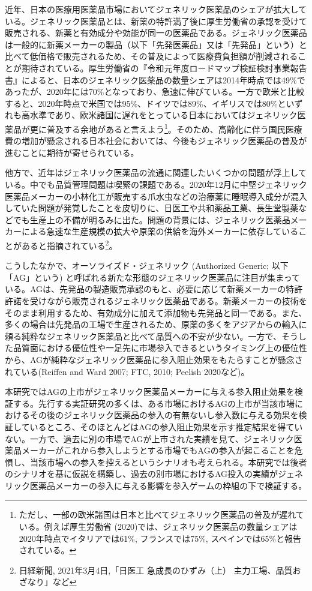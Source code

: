 \documentclass[a4j,10.5pt]{jarticle}
\begin{document}
近年、日本の医療用医薬品市場においてジェネリック医薬品のシェアが拡大している。ジェネリック医薬品とは、新薬の特許満了後に厚生労働省の承認を受けて販売される、新薬と有効成分や効能が同一の医薬品である。ジェネリック医薬品は一般的に新薬メーカーの製品（以下「先発医薬品」又は「先発品」という）と比べて低価格で販売されるため、その普及によって医療費負担額が削減されることが期待されている。厚生労働省の『令和元年度ロードマップ検証検討事業報告書』によると、日本のジェネリック医薬品の数量シェアは2014年時点では49\%であったが、2020年には70\%となっており、急速に伸びている。一方で欧米と比較すると、2020年時点で米国では95\%、ドイツでは89\%、イギリスでは80\%といずれも高水準であり、欧米諸国に遅れをとっている日本においてはジェネリック医薬品が更に普及する余地があると言えよう\footnote{ただし、一部の欧米諸国は日本と比べてジェネリック医薬品の普及が遅れている。例えば厚生労働省 (2020)では、ジェネリック医薬品の数量シェアは2020年時点でイタリアでは61\%, フランスでは75\%, スペインでは65\%と報告されている。}。そのため、高齢化に伴う国民医療費の増加が懸念される日本社会においては、今後もジェネリック医薬品の普及が進むことに期待が寄せられている。\par
他方で、近年はジェネリック医薬品の流通に関連したいくつかの問題が浮上している。中でも品質管理問題は喫緊の課題である。2020年12月に中堅ジェネリック医薬品メーカーの小林化工が販売する爪水虫などの治療薬に睡眠導入成分が混入していた問題が発覚したことを皮切りに、日医工や共和薬品工業、長生堂製薬などでも生産上の不備が明るみに出た。問題の背景には、ジェネリック医薬品メーカーによる急速な生産規模の拡大や原薬の供給を海外メーカーに依存していることがあると指摘されている\footnote{日経新聞, 2021年3月4日,「日医工 急成長のひずみ（上） 主力工場、品質おざなり」など}。\par
こうしたなかで、オーソライズド・ジェネリック (Authorized Generic; 以下「AG」という) と呼ばれる新たな形態のジェネリック医薬品に注目が集まっている。AGは、先発品の製造販売承認のもと、必要に応じて新薬メーカーの特許許諾を受けながら販売されるジェネリック医薬品である。新薬メーカーの技術をそのまま利用するため、有効成分に加えて添加物も先発品と同一である。また、多くの場合は先発品の工場で生産されるため、原薬の多くをアジアからの輸入に頼る純粋なジェネリック医薬品と比べて品質への不安が少ない。一方で、そうした品質面における優位性や一足先に市場参入できるというタイミング上の優位性から、AGが純粋なジェネリック医薬品に参入阻止効果をもたらすことが懸念されている(Reiffen and Ward 2007; FTC, 2010; Peelish 2020など)。\par
本研究ではAGの上市がジェネリック医薬品メーカーに与える参入阻止効果を検証する。先行する実証研究の多くは、ある市場におけるAGの上市が当該市場におけるその後のジェネリック医薬品の参入の有無ないし参入数に与える効果を検証しているところ、そのほとんどはAGの参入阻止効果を示す推定結果を得ていない。一方で、過去に別の市場でAGが上市された実績を見て、ジェネリック医薬品メーカーがこれから参入しようとする市場でもAGの参入が起こることを危惧し、当該市場への参入を控えるというシナリオも考えられる。本研究では後者のシナリオを基に仮説を構築し、過去の別市場におけるAG投入の実績がジェネリック医薬品メーカーの参入に与える影響を参入ゲームの枠組の下で検証する。\par
\end{document}
